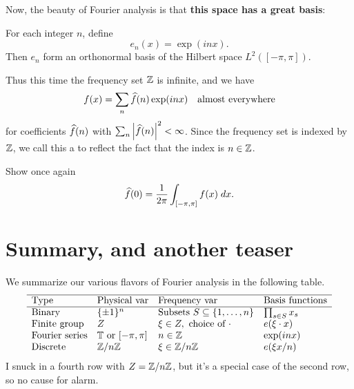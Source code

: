 Now, the beauty of Fourier analysis is that
\textbf{this space has a great basis}:
\begin{theorem}
	For each integer $n$, define
	\[ e_n(x) = \exp(inx). \]
	Then $e_n$ form an orthonormal basis
	of the Hilbert space $L^2([-\pi, \pi])$.
\end{theorem}
Thus this time the frequency set $\mathbb Z$ is infinite, and we have
\[ f(x) = \sum_n \widehat f(n) \exp(inx)
	\quad\text{almost everywhere} \]
for coefficients $\widehat f(n)$
with $\sum_n \left\lvert \widehat f(n) \right\rvert^2 < \infty$.
Since the frequency set is indexed by $\mathbb Z$,
we call this a 
to reflect the fact that the index is $n \in \mathbb Z$.
\begin{exercise}
	Show once again
	\[ \widehat f(0) = \frac{1}{2\pi} \int_{[-\pi, \pi]} f(x) \; dx. \]
\end{exercise}

\section{Summary, and another teaser}
We summarize our various flavors of Fourier analysis in the following table.
\[
	\begin{array}{llll}
		\hline
		\text{Type} & \text{Physical var} & \text{Frequency var}
			& \text{Basis functions} \\ \hline
		\text{Binary} & \{\pm1\}^n
			& \text{Subsets } S \subseteq \left\{ 1, \dots, n \right\}
			& \prod_{s \in S} x_s \\
		\text{Finite group} & Z & \xi \in Z, \text{ choice of } \cdot
			& e(\xi \cdot x) \\
		\text{Fourier series} & \mathbb T \text{ or } [-\pi, \pi] & n \in \mathbb Z
			& \exp(inx) \\
		\text{Discrete} & \mathbb Z/n\mathbb Z
			& \xi \in \mathbb Z/n\mathbb Z
			& e(\xi x / n) \\
	\end{array}
\]
I snuck in a fourth row with $Z  = \mathbb Z/n\mathbb Z$,
but it's a special case of the second row, so no cause for alarm.

